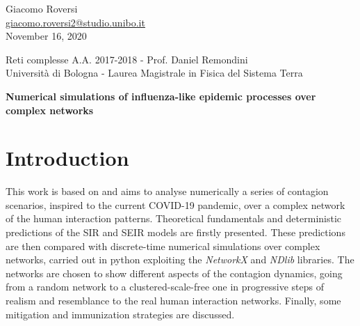 \documentclass[DIV=12, BCOR=0pt]{scrartcl}  %
\begin{document}
%	
%



\begin{flushright}
	{\large Giacomo Roversi} \\ 
	{\small \href{mailto:giacomo.roversi2@studio.unibo.it}{giacomo.roversi2@studio.unibo.it} }\\
	\vskip0.15in
	{\large November 16, 2020}
\end{flushright}

\begin{flushleft}
	{\Large \color{gray}
		Reti complesse A.A. 2017-2018 - Prof. Daniel Remondini  \\
		Università di Bologna - Laurea Magistrale in Fisica del Sistema Terra}


	\vskip0.2in
	{\huge\textbf{Numerical simulations of influenza-like epidemic processes over complex networks}} 
	\vskip0.33in
	
\end{flushleft}
	
	\section*{Introduction}
	\label{sec:intro}
	This work is based on \citet{Pastor-Satorras} %
	and aims to analyse numerically a series of contagion scenarios, inspired to the current COVID-19 pandemic, over a complex network of the human interaction patterns. 
 	Theoretical fundamentals and deterministic predictions of the SIR and SEIR models are firstly presented. These predictions are then compared with discrete-time numerical simulations over complex networks, carried out in python exploiting the \textit{NetworkX} and \textit{NDlib} libraries. The networks are chosen to show different aspects of the contagion dynamics, going from a random network to a clustered-scale-free one in progressive steps of realism and resemblance to the real human interaction networks. 
 	Finally, some mitigation and immunization strategies are discussed.
  
\end{document}
